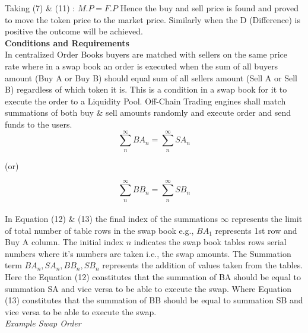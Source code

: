 \documentclass[10pt]{article}
\begin{document}
Taking (7) \& (11) : $M.P=F.P$ Hence the buy and sell price is found and proved to move the token price to the market price. Similarly when the D (Difference) is positive the outcome will be achieved. \\


\textbf{Conditions and Requirements}\\

In centralized Order Books buyers are matched with sellers on the same price rate where in a swap book an order is executed when the sum of all buyers amount (Buy A or Buy B) should equal sum of all sellers amount (Sell A or Sell B) regardless of which token it is. This is a condition in a swap book for it to execute the order to a Liquidity Pool. Off-Chain Trading engines shall match summations of both buy \& sell amounts randomly and execute order and send funds to the users.\\

\begin{equation}
\sum_{n}^{\infty} BA_n = \sum_{n}^{\infty} SA_n
\end{equation}
\begin{center}
(or)
\end{center}
\begin{equation}
\sum_{n}^{\infty} BB_n = \sum_{n}^{\infty} SB_n
\end{equation}\\

In Equation (12) \& (13) the final index of the summations $\infty$ represents the limit of total number of table rows in the swap book e.g., $BA_1$ represents 1st row and Buy A column. The initial index $n$ indicates the swap book tables rows serial numbers where it's numbers are taken i.e., the swap amounts. The Summation term $BA_n, SA_n, BB_n, SB_n$ represents the addition of values taken from the tables. Here the Equation (12) constitutes that the summation of BA should be equal to summation SA and vice versa to be able to execute the swap. Where Equation (13) constitutes that the summation of BB should be equal to summation SB and vice versa to be able to execute the swap.\\

\textit{Example Swap Order}\\
\end{document}
